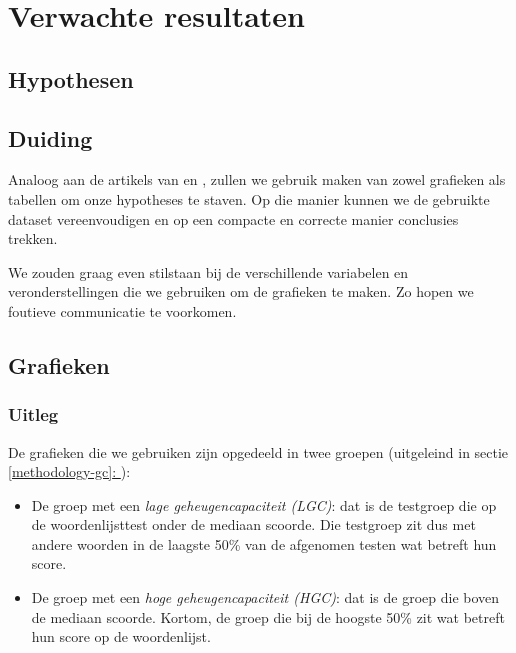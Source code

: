 \documentclass{hogent-article}
\newcommand{\customref}[1]{\underline{\ref{#1}: \nameref{#1}}}
\begin{document}
\section{Verwachte resultaten}

\subsection{Hypothesen}

\subsection{Duiding}

Analoog aan de artikels van \cite{HenryRoediger2006} en \cite{Agarwal2008}, zullen we gebruik maken van zowel grafieken als tabellen om onze hypotheses te staven. Op die manier kunnen we de gebruikte dataset vereenvoudigen en op een compacte en correcte manier conclusies trekken.\\
\par
\noindent
We zouden graag even stilstaan bij de verschillende variabelen en veronderstellingen die we gebruiken om de grafieken te maken. Zo hopen we foutieve communicatie te voorkomen.

\subsection{Grafieken}
\subsubsection{Uitleg}
De grafieken die we gebruiken zijn opgedeeld in twee groepen (uitgeleind in sectie \customref{methodology-gc}):
\begin{itemize}
	\item De groep met een \textit{lage geheugencapaciteit (LGC)}: dat is de testgroep die op de woordenlijsttest onder de mediaan scoorde. Die testgroep zit dus met andere woorden in de laagste 50\% van de afgenomen testen wat betreft hun score.
	\item De groep met een \textit{hoge geheugencapaciteit (HGC)}: dat is de groep die boven de mediaan scoorde. Kortom, de groep die bij de hoogste 50\% zit wat betreft hun score op de woordenlijst.
\end{itemize}
\end{document}
